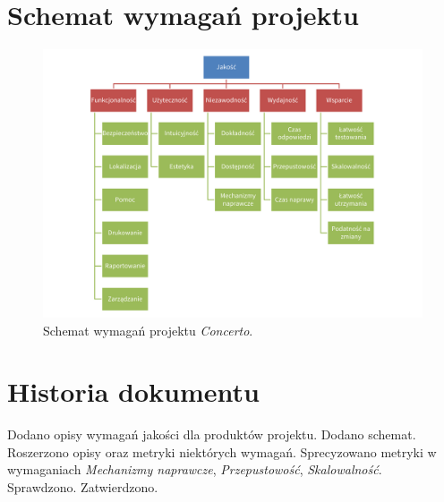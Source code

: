 \documentclass[10pt]{dokument-ppi}
\begin{document}
\newpage
\section*{Schemat wymagań projektu}

\begin{figure}[h!]
    \includegraphics[trim=4cm 0cm 4cm 0cm,width=\textwidth]{./figury/schemat-do-modelu-jakosci}
    \caption{Schemat wymagań projektu \emph{Concerto}.}
    \label{fig:schemat}
\end{figure}


\newpage
\section*{Historia dokumentu}
\begin{versions}
        Dodano opisy wymagań jakości dla produktów projektu.
        Dodano schemat.
        Roszerzono opisy oraz metryki niektórych wymagań.
        Sprecyzowano metryki w wymaganiach \emph{Mechanizmy naprawcze},
        \emph{Przepustowość}, \emph{Skalowalność}.\\
        Sprawdzono. Zatwierdzono.
\end{versions}
\end{document}
